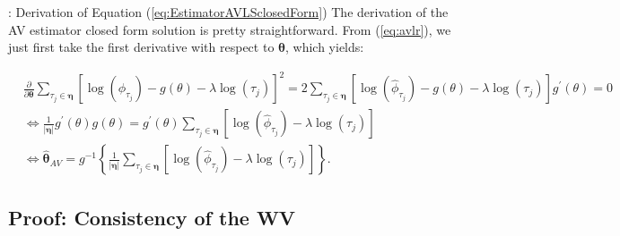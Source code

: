\documentclass[envcountsect,usenames,dvipsnames]{beamer}
\def\btheta{\bm \theta}
\theoremstyle{mystyle}
\begin{document}
\begin{frame}{\thesubsection: Derivation of Equation (\ref{eq:EstimatorAVLSclosedForm})}
\footnotesize
The derivation of the AV estimator closed form solution is pretty straightforward. From (\ref{eq:avlr}), we just first take the first derivative with respect to $\btheta$, which yields:

\begin{equation*}
\begin{aligned}
    &\frac{\partial}{\partial\bm{\theta}} \sum_{\tau_j \in \bm{\eta}} \left[ 	\log \left( \hat{\phi}_{\tau_j} \right) - g\left( \theta \right) - \lambda \log \left( \tau_j \right) \right]^2 = 2\sum_{\tau_j \in \bm{\eta}}\left[ 	\log \left( \hat{\phi}_{\tau_j} \right) - g\left( \theta \right) - \lambda \log \left( \tau_j \right)\right] g^{\prime}\left( \theta \right) = 0 \\
    &\Leftrightarrow \frac{1}{|\bm{\eta}|} g^{\prime}\left( \theta \right) g\left( \theta \right) = g^{\prime}\left( \theta \right) \sum_{\tau_j \in \bm{\eta}} \left[ 	\log \left( \hat{\phi}_{\tau_j} \right) - \lambda \log \left( \tau_j \right) \right] \\
    &\Leftrightarrow \hat{\btheta}_{AV} = g^{-1} \left\{\frac{1}{| \bm{\eta}|} \sum_{\tau_j \in \bm{\eta}} \left[ \log \left( \hat{\phi}_{\tau_j}  \right) - \lambda \log \left( \tau_j \right)\right]\right\}.
\end{aligned}
\end{equation*}


\vspace{0.25cm}
\hyperlink{eq:EstimatorAVLSclosedForm}{}

\end{frame}


\subsection{Proof: Consistency of the WV}
\label{proof:consistencyWV}
\end{document}
